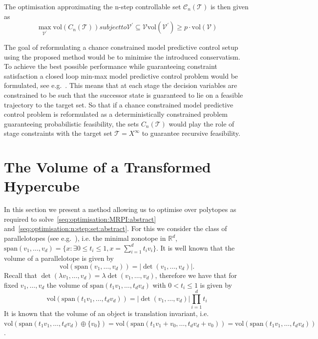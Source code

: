 \documentclass{ifacconf}
\providecommand{\abs}[1]{\left|#1\right|}
\providecommand{\vol}{\text{vol}}
\providecommand{\spann}{\text{span}}
\providecommand{\C}{\mathcal C}
\providecommand{\V}{\mathcal V}
\providecommand{\T}{\mathcal T}
\providecommand{\RR}{\mathbb R}
\begin{document}
The optimisation approximating the n-step controllable set $\C_n(\T)$ is then given as
%
\begin{subequations}\label{seq:optimisation:n:step:set:abstract}
	\begin{equation}
		\max_{\V^\prime} \vol(C_n(\T))
	\end{equation}
	subject to
	\begin{equation}
	\V^\prime\subseteq\V
\end{equation}
%
\begin{equation}
	\vol(\V^\prime)\geq p\cdot\vol(\V)
\end{equation}
\end{subequations}

\begin{rem}
The goal of reformulating a chance constrained model predictive control setup using the proposed method would be to minimise the introduced conservatism.
%
To achieve the best possible performance while guaranteeing constraint satisfaction a closed loop min-max model predictive control problem would be formulated, see e.g.~\cite{Lee:1997}.
%
This means that at each stage the decision variables are constrained to be such that the successor state is guaranteed to lie on a feasible trajectory to the target set.
%
So that if a chance constrained model predictive control problem is reformulated as a deterministically constrained problem guaranteeing probabilistic feasibility, the sets $C_n(\T)$ would play the role of stage constraints with the target set $\T=X^\infty$ to guarantee recursive feasibility.
\end{rem}


\section{The Volume of a Transformed Hypercube}\label{sec:volume:of:hypercube}
%
%
In this section we present a method allowing us to optimise over polytopes as required to solve~\eqref{seq:optimisation:MRPI:abstract} and~\eqref{seq:optimisation:n:step:set:abstract}.
%
For this we consider the class of parallelotopes (see e.g.~\cite{Coxeter:1973}), i.e. the minimal zonotope in $\RR^d$, $\spann(v_1,\dots,v_d) = \{x:\exists 0\leq t_i\leq1, x = \sum_{i=1}^d t_iv_i\}$.
%
It is well known that the volume of a parallelotope is given by
%
\begin{equation}
	\vol(\spann(v_1,\dots,v_d)) = \abs{\det(v_1,\dots,v_d)}.
\end{equation}
%
Recall that $\det(\lambda v_1,\dots,v_d) = \lambda\det(v_1,\dots,v_d)$, therefore we have that for fixed $v_1,\dots,v_d$ the volume of $\spann(t_1v_1,\dots,t_dv_d)$ with $0<t_i\leq1$ is given by
%
\begin{equation}
	\vol(\spann(t_1v_1,\dots,t_dv_d)) = \abs{\det(v_1,\dots,v_d)}\prod_{i=1}^d t_i
\end{equation}
%
It is known that the volume of an object is translation invariant, i.e. $\vol(\spann(t_1v_1,\dots,t_dv_d)\oplus\{v_0\}) = \vol(\spann(t_1v_1+v_0,\dots,t_dv_d+v_0)) = \vol(\spann(t_1v_1,\dots,t_dv_d))$.
\end{document}
